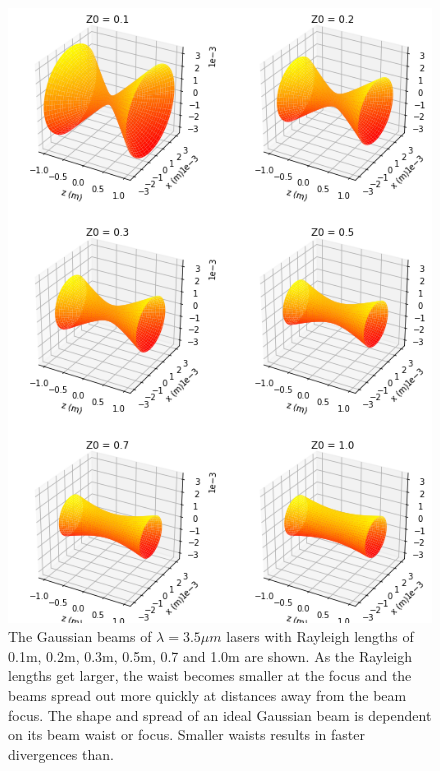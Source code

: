\documentclass[11pt,a4paper]{book}
\begin{document}
	\begin{figure} 
	\centering
	\includegraphics[scale=0.85]{images/chapter-3/Gaussian_beams_3d_plots}
	\caption{The Gaussian beams of $\lambda = 3.5 \mu m$ lasers with Rayleigh lengths of 0.1m, 0.2m, 0.3m, 0.5m, 0.7 and 1.0m are shown. As the Rayleigh lengths get larger, the waist becomes smaller at the focus and the beams spread out more quickly at distances away from the beam focus. The shape and spread of an ideal Gaussian beam is dependent on its beam waist or focus. Smaller waists results in faster divergences than.}
	\label{fig:Gaussian_beams_3d_plots}	
	\end{figure}
\end{document}
